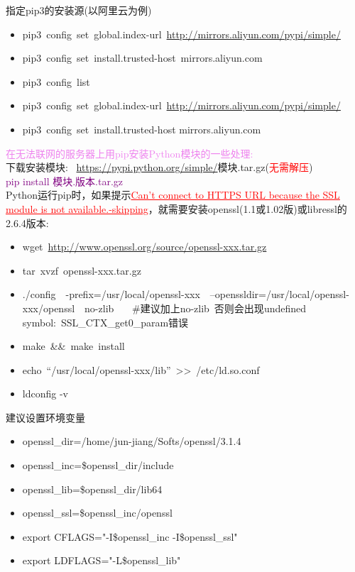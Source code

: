 \documentclass[10pt,a4paper]{article}
\begin{document}
指定\textrm{pip3}的安装源(以阿里云为例)
\begin{itemize}
	\item \textrm{pip3~config~set~global.index-url~\url{http://mirrors.aliyun.com/pypi/simple/}}
	\item \textrm{pip3~config~set~install.trusted-host~mirrors.aliyun.com}
	\item \textrm{pip3~config~list}
	\item \textrm{pip3~config~set~global.index-url~\url{http://mirrors.aliyun.com/pypi/simple/}}
	\item \textrm{pip3~config~set~install.trusted-host mirrors.aliyun.com}
\end{itemize}

\textcolor{violet}{在无法联网的服务器上用\textrm{pip}安装\textrm{Python}模块的一些处理:}\\
下载安装模块:~ \textrm{\url{https://pypi.python.org/simple/}}模块.tar.gz\:\:\:(\textcolor{red}{无需解压})\\
\textcolor{purple}{pip install 模块.版本.tar.gz}\\


\textrm{Python}运行\textrm{pip}时，如果提示\textcolor{red}{\underline{\textrm{Can't connect to HTTPS URL because the SSL module is not available.-skipping}}}，就需要安装\textrm{openssl}(1.1或1.02版)或\textrm{libressl}的2.6.4版本:
\begin{itemize}
	\item \textrm{wget~\url{http://www.openssl.org/source/openssl-xxx.tar.gz}}
	\item \textrm{tar~xvzf~openssl-xxx.tar.gz}
	\item \textrm{./config~~-prefix=/usr/local/openssl-xxx~~--openssldir=/usr/local/openssl-xxx/openssl~~no-zlib} ~~~\#建议加上\textrm{no-zlib}~否则会出现\textrm{undefined symbol:~SSL\_CTX\_get0\_param}错误
	\item \textrm{make~\&\&~make~install}
	\item \textrm{echo~``/usr/local/openssl-xxx/lib''~>>~/etc/ld.so.conf}
	\item \textrm{ldconfig -v}
\end{itemize}
建议设置环境变量
\begin{itemize}
	\item openssl\_dir=/home/jun-jiang/Softs/openssl/3.1.4
	\item openssl\_inc=\$openssl\_dir/include
	\item openssl\_lib=\$openssl\_dir/lib64
	\item openssl\_ssl=\$openssl\_inc/openssl

	\item export CFLAGS="-I\$openssl\_inc -I\$openssl\_ssl"
	\item export LDFLAGS="-L\$openssl\_lib"
\end{itemize}
\end{document}
